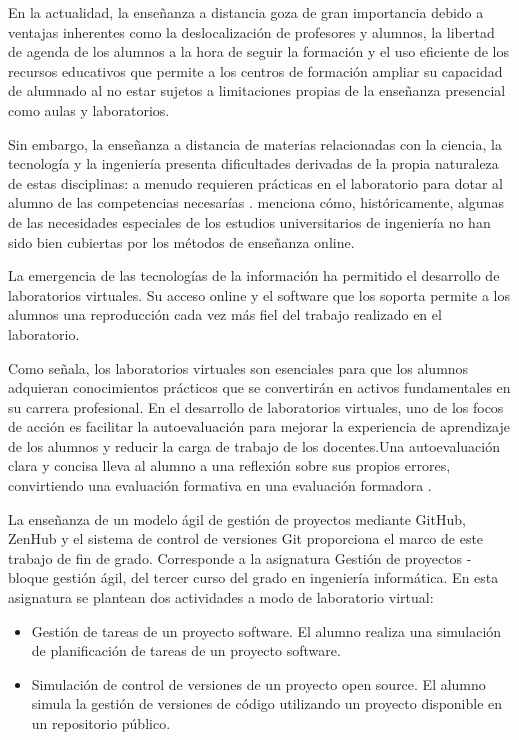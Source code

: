 
En la actualidad, la enseñanza a distancia goza de gran importancia debido a ventajas inherentes como la deslocalización de profesores y alumnos, la libertad de agenda de los alumnos a la hora de seguir la formación y el uso eficiente de los recursos educativos que permite a los centros de formación ampliar su capacidad de alumnado al no estar sujetos a limitaciones propias de la enseñanza presencial como aulas y laboratorios.

Sin embargo, la enseñanza a distancia de materias relacionadas con la ciencia, la tecnología y  la ingeniería  presenta dificultades derivadas de la propia naturaleza de estas disciplinas: a menudo requieren prácticas en el laboratorio para dotar al alumno de las competencias necesarías . \cite{bourne2019} menciona  cómo, históricamente, algunas de las necesidades especiales de los estudios universitarios de ingeniería no han sido bien cubiertas por los métodos de enseñanza online.

La emergencia de las tecnologías de la información ha permitido el desarrollo de laboratorios virtuales. Su acceso online y el software que los soporta permite a los alumnos una reproducción cada vez más fiel del trabajo realizado en el laboratorio.

Como \cite{tejado2018}  señala, los laboratorios virtuales son esenciales para que los alumnos adquieran conocimientos prácticos que se convertirán en  activos fundamentales en su  carrera profesional. En el desarrollo de laboratorios virtuales, uno de los focos de acción es facilitar la autoevaluación para mejorar la experiencia de aprendizaje de los alumnos y reducir la carga de trabajo de los docentes.Una autoevaluación clara y concisa lleva al alumno a una reflexión sobre sus propios errores, convirtiendo una evaluación formativa en una evaluación formadora \cite{sánchez2009}.

La enseñanza de un modelo ágil de gestión de proyectos mediante GitHub, ZenHub  y el sistema de control de versiones Git proporciona el marco de este trabajo de fin de grado. Corresponde a la asignatura Gestión de proyectos - bloque gestión ágil, del tercer curso del grado en ingeniería informática. En esta asignatura se plantean dos actividades a modo de laboratorio virtual:

\begin{itemize}
	\item Gestión de tareas de un proyecto software. El alumno realiza una simulación de planificación de tareas de un proyecto software.
	\item Simulación de control de versiones de un proyecto open source. El alumno simula la gestión de versiones de código utilizando un proyecto disponible en un repositorio público.
\end{itemize}

